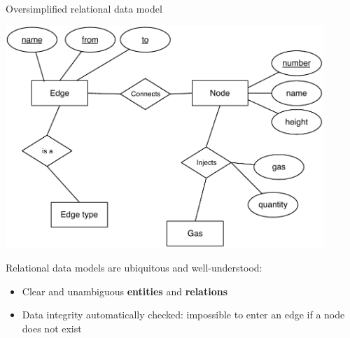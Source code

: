 \documentclass[10pt,aspectratio=169]{beamer}
\begin{document}
\begin{frame}{Oversimplified relational data model}
    \begin{minipage}{0.6\textwidth}
        \begin{center}
            \includegraphics[width=0.9\textwidth]{img/data_arch}
        \end{center}
    \end{minipage}
    \begin{minipage}{0.39\textwidth}
        Relational data models are ubiquitous and well-understood:
        \begin{itemize}
            \item Clear and unambiguous \textbf{entities} and \textbf{relations}
            \item Data integrity automatically checked: impossible to enter an edge if a node does not exist
        \end{itemize}
    \end{minipage}
\end{frame}
\end{document}
